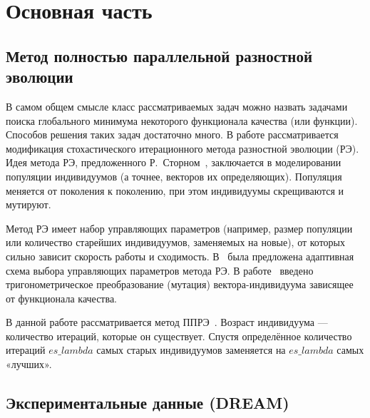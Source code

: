 \chapter*{Основная часть} %

\section{Метод полностью параллельной разностной эволюции} \label{s1}

В самом общем смысле класс рассматриваемых задач можно назвать задачами 
поиска глобального минимума некоторого функционала качества (или функции). 
Способов решения таких задач достаточно много. В работе рассматривается 
модификация стохастического итерационного метода разностной эволюции (РЭ). 
Идея метода РЭ, предложенного Р.~Сторном~\cite{bib1}, заключается в 
моделировании популяции индивидуумов (а точнее, векторов их определяющих). 
Популяция меняется от поколения к поколению, при этом индивидуумы скрещиваются 
и мутируют. 

Метод РЭ имеет набор управляющих параметров (например, размер популяции 
или количество старейших индивидуумов, заменяемых на новые), от которых сильно 
зависит скорость работы и сходимость. В~\cite{bibZaharie} была предложена 
адаптивная схема выбора управляющих параметров метода РЭ. В работе~\cite{bibTM}
введено тригонометрическое преобразование (мутация) вектора-индивидуума 
зависящее от функционала качества. 

В данной работе рассматривается метод ППРЭ~\cite{bib2,bib5}. 
Возраст индивидуума — количество итераций, которые он существует. 
Спустя определённое количество итераций $es\_lambda$ самых старых
индивидуумов заменяется на $es\_lambda$ самых «лучших».

\section{Экспериментальные данные (DREAM)} \label{s2}

